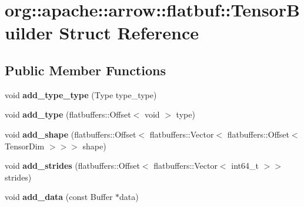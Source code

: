 \hypertarget{structorg_1_1apache_1_1arrow_1_1flatbuf_1_1TensorBuilder}{}\section{org\+:\+:apache\+:\+:arrow\+:\+:flatbuf\+:\+:Tensor\+Builder Struct Reference}
\label{structorg_1_1apache_1_1arrow_1_1flatbuf_1_1TensorBuilder}
\subsection*{Public Member Functions}
\begin{DoxyCompactItemize}
\item 
void {\bfseries add\+\_\+type\+\_\+type} (Type type\+\_\+type)\hypertarget{structorg_1_1apache_1_1arrow_1_1flatbuf_1_1TensorBuilder_af4226f358c4a3bf991154d5b501498b8}{}\label{structorg_1_1apache_1_1arrow_1_1flatbuf_1_1TensorBuilder_af4226f358c4a3bf991154d5b501498b8}

\item 
void {\bfseries add\+\_\+type} (flatbuffers\+::\+Offset$<$ void $>$ type)\hypertarget{structorg_1_1apache_1_1arrow_1_1flatbuf_1_1TensorBuilder_a20948bedca067345b22962ac942af8b9}{}\label{structorg_1_1apache_1_1arrow_1_1flatbuf_1_1TensorBuilder_a20948bedca067345b22962ac942af8b9}

\item 
void {\bfseries add\+\_\+shape} (flatbuffers\+::\+Offset$<$ flatbuffers\+::\+Vector$<$ flatbuffers\+::\+Offset$<$ Tensor\+Dim $>$$>$$>$ shape)\hypertarget{structorg_1_1apache_1_1arrow_1_1flatbuf_1_1TensorBuilder_a485e90513d462a0ad61908928013c765}{}\label{structorg_1_1apache_1_1arrow_1_1flatbuf_1_1TensorBuilder_a485e90513d462a0ad61908928013c765}

\item 
void {\bfseries add\+\_\+strides} (flatbuffers\+::\+Offset$<$ flatbuffers\+::\+Vector$<$ int64\+\_\+t $>$$>$ strides)\hypertarget{structorg_1_1apache_1_1arrow_1_1flatbuf_1_1TensorBuilder_a61cce0661e820a2512ae702de9ddd9ad}{}\label{structorg_1_1apache_1_1arrow_1_1flatbuf_1_1TensorBuilder_a61cce0661e820a2512ae702de9ddd9ad}

\item 
void {\bfseries add\+\_\+data} (const Buffer $\ast$data)\hypertarget{structorg_1_1apache_1_1arrow_1_1flatbuf_1_1TensorBuilder_a3b6b9a2dfdfbf6f233457516b4101e7e}{}\label{structorg_1_1apache_1_1arrow_1_1flatbuf_1_1TensorBuilder_a3b6b9a2dfdfbf6f233457516b4101e7e}


\end{DoxyCompactItemize}
